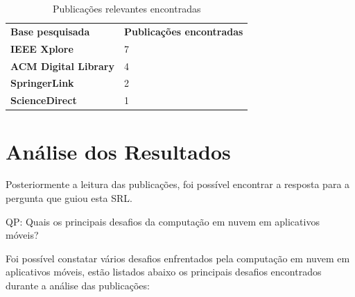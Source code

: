 \documentclass[12pt]{article}
\begin{document}
\begin{table}[h]
 \centering
 {\renewcommand\arraystretch{1.25}
 \begin{tabular}{ l l }
  \cline{1-1}\cline{2-2}  
    \multicolumn{1}{|p{4.500cm}|}{\textbf{Base pesquisada}} &
    \multicolumn{1}{p{4.500cm}|}{\textbf{Publicações encontradas}}
  \\  
  \cline{1-1}\cline{2-2}  
    \multicolumn{1}{|p{4.500cm}|}{\textbf{IEEE Xplore} \centering } &
    \multicolumn{1}{p{4.500cm}|}{7 \centering }
  \\  
  \cline{1-1}\cline{2-2}  
    \multicolumn{1}{|p{4.500cm}|}{\textbf{ACM Digital Library} \centering } &
    \multicolumn{1}{p{4.500cm}|}{4 \centering }
  \\  
  \cline{1-1}\cline{2-2}  
    \multicolumn{1}{|p{4.500cm}|}{\textbf{SpringerLink} \centering } &
    \multicolumn{1}{p{4.500cm}|}{2 \centering }
  \\  
  \cline{1-1}\cline{2-2}  
    \multicolumn{1}{|p{4.500cm}|}{\textbf{ScienceDirect} \centering } &
    \multicolumn{1}{p{4.500cm}|}{1 \centering }
  \\  
  \hline

 \end{tabular} }
 \caption{Publicações relevantes encontradas} 
 \label{publicações} 
\end{table}




\section{Análise dos Resultados}

Posteriormente a leitura das publicações, foi possível encontrar a resposta para a pergunta que guiou esta SRL.

QP: Quais os principais desafios da computação em nuvem em aplicativos móveis?

Foi possível constatar vários desafios enfrentados pela computação em nuvem em aplicativos móveis, estão listados abaixo os
principais desafios encontrados durante a análise das publicações:
\end{document}
